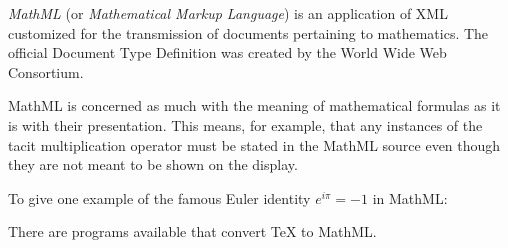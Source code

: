 \documentclass[12pt]{article}
\begin{document}
{\em MathML} (or {\em Mathematical Markup Language}) is an application of XML customized for the transmission of documents pertaining to mathematics. The official Document Type Definition was created by the World Wide Web Consortium.

MathML is concerned as much with the meaning of mathematical formulas as it is with their presentation. This means, for example, that any instances of the tacit multiplication operator must be stated in the MathML source even though they are not meant to be shown on the display.

To give one example of the famous Euler identity $e^{i\pi} = -1$ in MathML:


There are programs available that convert \TeX{} to MathML.
\end{document}
